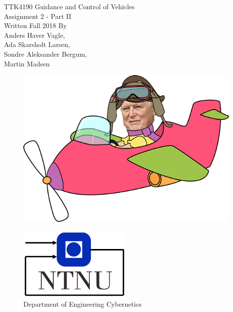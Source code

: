 \documentclass[a4paper]{article}
\begin{document}
\begin{titlepage}
\begin{center}
\Large TTK4190 Guidance and Control of Vehicles \\
\vspace{10pt}
\Large  Assignment 2 - Part II\\
\vspace{10pt}
\large Written Fall 2018 By \\
\large Anders Haver Vagle,\\ Ada Skarsholt Larsen,\\ Sondre Aleksander Bergum,\\ Martin Madsen

\vspace{2.0cm}

\begin{figure}[h]
\centering
\includegraphics[width=1.0\textwidth]{figures/flying-kalman.png}
\end{figure}

\begin{figure}[b]
\centering
\includegraphics[width=0.5\textwidth]{figures/itk_ntnu}\\
Department of Engineering Cybernetics
\end{figure}
\end{center}
\end{titlepage}






\end{document}
